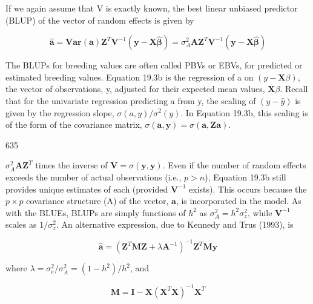 \documentclass{article}
\begin{document}
If we again assume that V is exactly known, the best linear unbiased predictor (BLUP) of the vector of random effects is given by

\begin{equation}
\hat{\mathbf{a}}=\mathbf{V}\mathbf{a}\mathbf{r}(\mathbf{a})\mathbf{Z}^{T}\mathbf{V}^{-1}\left(\mathbf{y}-\mathbf{X}\widehat{\boldsymbol{\beta}}\right)=\sigma_{A}^{2}\mathbf{A}\mathbf{Z}^{T}\mathbf{V}^{-1}\left(\mathbf{y}-\mathbf{X}\widehat{\boldsymbol{\beta}}\right)
\tag{19.3b}
\label{eq:19_3b}
\end{equation}

The BLUPs for breeding values are often called PBVs or EBVs, for predicted or estimated breeding values. Equation 19.3b is the regression of a on  $ (y - \mathbf{X}\beta) $, the vector of observations, y, adjusted for their expected mean values,  $ \mathbf{X}\beta $. Recall that for the univariate regression predicting a from y, the scaling of  $ (y - \hat{y}) $ is given by the regression slope,  $ \sigma(a, y)/\sigma^2(y) $. In Equation 19.3b, this scaling is of the form of the covariance matrix,  $ \sigma(\mathbf{a}, \mathbf{y}) = \sigma(\mathbf{a}, \mathbf{Z}\mathbf{a}) $.

635

 $ \sigma_A^2 \mathbf{A} \mathbf{Z}^T $ times the inverse of  $ \mathbf{V} = \sigma(\mathbf{y}, \mathbf{y}) $. Even if the number of random effects exceeds the number of actual observations (i.e.,  $ p > n $), Equation 19.3b still provides unique estimates of each (provided  $ \mathbf{V}^{-1} $ exists). This occurs because the  $ p \times p $ covariance structure (A) of the vector,  $ \mathbf{a} $, is incorporated in the model. As with the BLUEs, BLUPs are simply functions of  $ h^2 $ as  $ \sigma_A^2 = h^2 \sigma_z^2 $, while  $ \mathbf{V}^{-1} $ scales as  $ 1/\sigma_z^2 $. An alternative expression, due to Kennedy and Trus (1993), is

\begin{equation}
\hat{\mathbf{a}}=\left(\mathbf{Z}^{T}\mathbf{M}\mathbf{Z}+\lambda\mathbf{A}^{-1}\right)^{-1}\mathbf{Z}^{T}\mathbf{M}\mathbf{y}
\tag{19.3c}
\label{eq:19_3c}
\end{equation}

where  $ \lambda = \sigma_{e}^{2} / \sigma_{A}^{2} = (1 - h^{2}) / h^{2} $, and

\begin{equation}
\mathbf{M}=\mathbf{I}-\mathbf{X}\left(\mathbf{X}^{T}\mathbf{X}\right)^{-1}\mathbf{X}^{T}
\tag{19.3d}
\label{eq:19_3d}
\end{equation}
\end{document}
